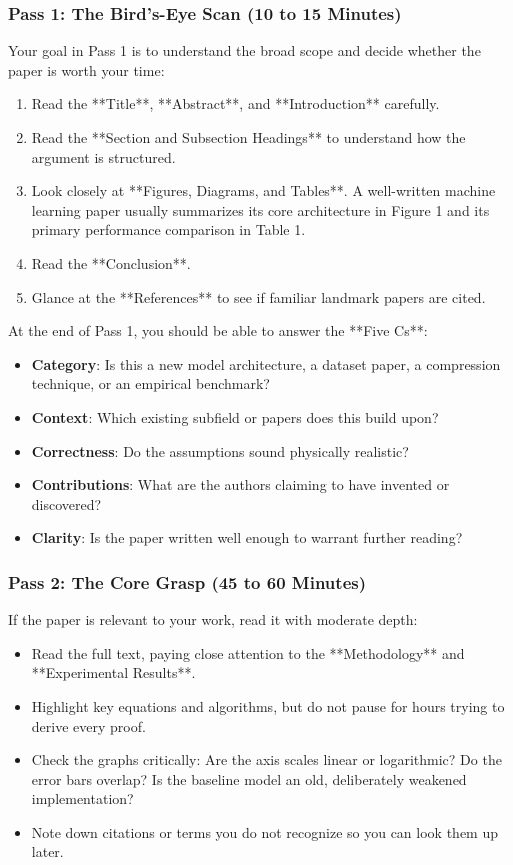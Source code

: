 \subsubsection*{Pass 1: The Bird's-Eye Scan (10 to 15 Minutes)}
Your goal in Pass 1 is to understand the broad scope and decide whether the paper is worth your time:
\begin{enumerate}
    \item Read the **Title**, **Abstract**, and **Introduction** carefully.
    \item Read the **Section and Subsection Headings** to understand how the argument is structured.
    \item Look closely at **Figures, Diagrams, and Tables**. A well-written machine learning paper usually summarizes its core architecture in Figure 1 and its primary performance comparison in Table 1.
    \item Read the **Conclusion**.
    \item Glance at the **References** to see if familiar landmark papers are cited.
\end{enumerate}
At the end of Pass 1, you should be able to answer the **Five Cs**:
\begin{itemize}
    \item \textbf{Category}: Is this a new model architecture, a dataset paper, a compression technique, or an empirical benchmark?
    \item \textbf{Context}: Which existing subfield or papers does this build upon?
    \item \textbf{Correctness}: Do the assumptions sound physically realistic?
    \item \textbf{Contributions}: What are the authors claiming to have invented or discovered?
    \item \textbf{Clarity}: Is the paper written well enough to warrant further reading?
\end{itemize}

\subsubsection*{Pass 2: The Core Grasp (45 to 60 Minutes)}
If the paper is relevant to your work, read it with moderate depth:
\begin{itemize}
    \item Read the full text, paying close attention to the **Methodology** and **Experimental Results**.
    \item Highlight key equations and algorithms, but do not pause for hours trying to derive every proof.
    \item Check the graphs critically: Are the axis scales linear or logarithmic? Do the error bars overlap? Is the baseline model an old, deliberately weakened implementation?
    \item Note down citations or terms you do not recognize so you can look them up later.
\end{itemize}

